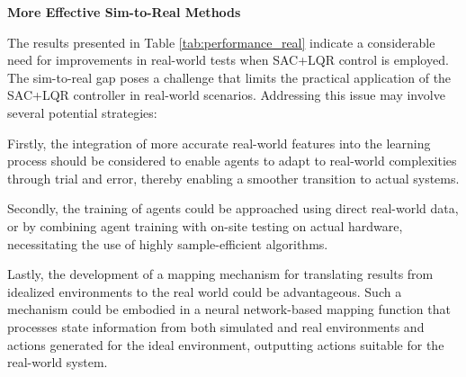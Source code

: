 \textbf{More Effective Sim-to-Real Methods}

The results presented in Table \ref{tab:performance_real} indicate a considerable need for improvements in real-world tests when SAC+LQR control is employed. The sim-to-real gap poses a challenge that limits the practical application of the SAC+LQR controller in real-world scenarios. Addressing this issue may involve several potential strategies: 

Firstly, the integration of more accurate real-world features into the learning process should be considered to enable agents to adapt to real-world complexities through trial and error, thereby enabling a smoother transition to actual systems. 

Secondly, the training of agents could be approached using direct real-world data, or by combining agent training with on-site testing on actual hardware, necessitating the use of highly sample-efficient algorithms. 

Lastly, the development of a mapping mechanism for translating results from idealized environments to the real world could be advantageous. Such a mechanism could be embodied in a neural network-based mapping function that processes state information from both simulated and real environments and actions generated for the ideal environment, outputting actions suitable for the real-world system.

\cleardoublepage
